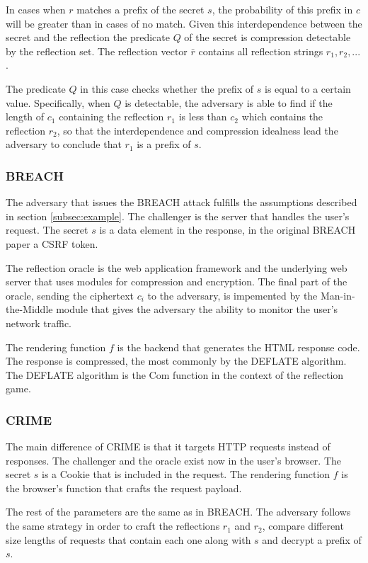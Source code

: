 In cases when $r$ matches a prefix of the secret $s$, the probability
of this prefix in $c$ will be greater than in cases of no match.
Given this interdependence between the secret and the reflection the predicate
$Q$ of the secret is compression detectable by the reflection set. The
reflection vector $\bar{r}$ contains all reflection strings $r_1, r_2, ...$.

The predicate $Q$ in this case checks whether the prefix of $s$ is equal to a
certain value. Specifically, when $Q$ is detectable, the adversary is able to
find if the length of $c_1$ containing the reflection $r_1$ is less than $c_2$
which contains the reflection $r_2$, so that the interdependence and compression
idealness lead the adversary to conclude that $r_1$ is a prefix of $s$.

\subsubsection{BREACH}
The adversary that issues the BREACH attack fulfills the assumptions described
in section \ref{subsec:example}. The challenger is the server that handles the
user's request. The secret $s$ is a data element in the response, in the
original BREACH paper a CSRF token.

The reflection oracle is the web application framework and the underlying web
server that uses modules for compression and encryption. The final part of the
oracle, sending the ciphertext $c_i$ to the adversary, is impemented by the
Man-in-the-Middle module that gives the adversary the ability to monitor the
user's network traffic.

The rendering function $f$ is the backend that generates the HTML response code.
The response is compressed, the most commonly by the DEFLATE algorithm. The
DEFLATE algorithm is the $\textrm{Com}$ function in the context of the
reflection game.

\subsubsection{CRIME}
The main difference of CRIME is that it targets HTTP requests instead of
responses. The challenger and the oracle exist now in the user's browser. The
secret $s$ is a Cookie that is included in the request. The rendering function
$f$ is the browser's function that crafts the request payload.

The rest of the parameters are the same as in BREACH. The adversary follows the
same strategy in order to craft the reflections $r_1$ and $r_2$, compare
different size lengths of requests that contain each one along with $s$ and
decrypt a prefix of $s$.

